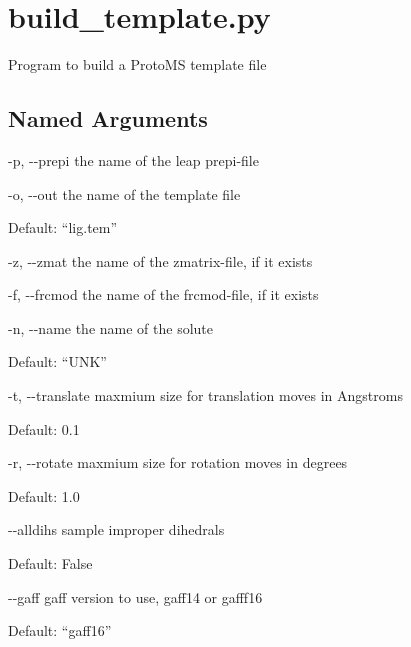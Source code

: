 \documentclass[letterpaper,10pt,english]{sphinxmanual}
\begin{document}
\section{build\_template.py}
\label{\detokenize{tools:build-template-py}}

Program to build a ProtoMS template file


%
\begin{sphinxVerbatim}[commandchars=\\\{\}]
  \PYG{p}{[}\PYG{p}{]} \PYG{p}{[} \PYG{p}{]} \PYG{p}{[} \PYG{p}{]} \PYG{p}{[} \PYG{p}{]} \PYG{p}{[} \PYG{p}{]}
                         \PYG{p}{[} \PYG{p}{]} \PYG{p}{[} \PYG{p}{]} \PYG{p}{[} \PYG{p}{]} \PYG{p}{[}\PYG{p}{]}
                         \PYG{p}{[} \PYG{p}{]}
\end{sphinxVerbatim}


\subsection{Named Arguments}
\label{\detokenize{tools:Named Arguments}}\begin{optionlist}{3cm}
\item [-p, -{-}prepi]  
the name of the leap prepi-file
\item [-o, -{-}out]  
the name of the template file

Default: “lig.tem”
\item [-z, -{-}zmat]  
the name of the zmatrix-file, if it exists
\item [-f, -{-}frcmod]  
the name of the frcmod-file, if it exists
\item [-n, -{-}name]  
the name of the solute

Default: “UNK”
\item [-t, -{-}translate]  
maxmium size for translation moves in Angstroms

Default: 0.1
\item [-r, -{-}rotate]  
maxmium size for rotation moves in degrees

Default: 1.0
\item [-{-}alldihs]  
sample improper dihedrals

Default: False
\item [-{-}gaff]  
gaff version to use, gaff14 or gafff16

Default: “gaff16”
\end{optionlist}
\end{document}
